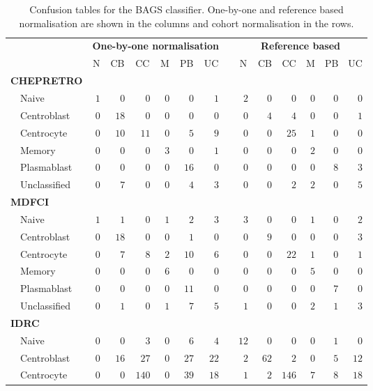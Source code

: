 \begin{table}[!tbp]
{\small
\caption{Confusion tables for the BAGS classifier. One-by-one and reference
based normalisation are shown in the columns and cohort normalisation in the
rows.\label{tab:BAGShemaclass}} 
\begin{center}
\begin{tabular}{lrrrrrrcrrrrrr}
\hline\hline
\multicolumn{1}{l}{\bfseries }&\multicolumn{6}{c}{\bfseries One-by-one normalisation}&\multicolumn{1}{c}{\bfseries }&\multicolumn{6}{c}{\bfseries Reference based}\tabularnewline
\cline{2-7} \cline{9-14}
\multicolumn{1}{l}{}&\multicolumn{1}{c}{N}&\multicolumn{1}{c}{CB}&\multicolumn{1}{c}{CC}&\multicolumn{1}{c}{M}&\multicolumn{1}{c}{PB}&\multicolumn{1}{c}{UC}&\multicolumn{1}{c}{}&\multicolumn{1}{c}{N}&\multicolumn{1}{c}{CB}&\multicolumn{1}{c}{CC}&\multicolumn{1}{c}{M}&\multicolumn{1}{c}{PB}&\multicolumn{1}{c}{UC}\tabularnewline
\hline
{\bfseries CHEPRETRO}&&&&&&&&&&&&&\tabularnewline
~~Naive&$1$&$ 0$&$  0$&$0$&$ 0$&$ 1$&&$ 2$&$ 0$&$  0$&$ 0$&$ 0$&$ 0$\tabularnewline
~~Centroblast&$0$&$18$&$  0$&$0$&$ 0$&$ 0$&&$ 0$&$ 4$&$  4$&$ 0$&$ 0$&$ 1$\tabularnewline
~~Centrocyte&$0$&$10$&$ 11$&$0$&$ 5$&$ 9$&&$ 0$&$ 0$&$ 25$&$ 1$&$ 0$&$ 0$\tabularnewline
~~Memory&$0$&$ 0$&$  0$&$3$&$ 0$&$ 1$&&$ 0$&$ 0$&$  0$&$ 2$&$ 0$&$ 0$\tabularnewline
~~Plasmablast&$0$&$ 0$&$  0$&$0$&$16$&$ 0$&&$ 0$&$ 0$&$  0$&$ 0$&$ 8$&$ 3$\tabularnewline
~~Unclassified&$0$&$ 7$&$  0$&$0$&$ 4$&$ 3$&&$ 0$&$ 0$&$  2$&$ 2$&$ 0$&$ 5$\tabularnewline
\hline
{\bfseries MDFCI}&&&&&&&&&&&&&\tabularnewline
~~Naive&$1$&$ 1$&$  0$&$1$&$ 2$&$ 3$&&$ 3$&$ 0$&$  0$&$ 1$&$ 0$&$ 2$\tabularnewline
~~Centroblast&$0$&$18$&$  0$&$0$&$ 1$&$ 0$&&$ 0$&$ 9$&$  0$&$ 0$&$ 0$&$ 3$\tabularnewline
~~Centrocyte&$0$&$ 7$&$  8$&$2$&$10$&$ 6$&&$ 0$&$ 0$&$ 22$&$ 1$&$ 0$&$ 1$\tabularnewline
~~Memory&$0$&$ 0$&$  0$&$6$&$ 0$&$ 0$&&$ 0$&$ 0$&$  0$&$ 5$&$ 0$&$ 0$\tabularnewline
~~Plasmablast&$0$&$ 0$&$  0$&$0$&$11$&$ 0$&&$ 0$&$ 0$&$  0$&$ 0$&$ 7$&$ 0$\tabularnewline
~~Unclassified&$0$&$ 1$&$  0$&$1$&$ 7$&$ 5$&&$ 1$&$ 0$&$  0$&$ 2$&$ 1$&$ 3$\tabularnewline
\hline
{\bfseries IDRC}&&&&&&&&&&&&&\tabularnewline
~~Naive&$0$&$ 0$&$  3$&$0$&$ 6$&$ 4$&&$12$&$ 0$&$  0$&$ 0$&$ 1$&$ 0$\tabularnewline
~~Centroblast&$0$&$16$&$ 27$&$0$&$27$&$22$&&$ 2$&$62$&$  2$&$ 0$&$ 5$&$12$\tabularnewline
~~Centrocyte&$0$&$ 0$&$140$&$0$&$39$&$18$&&$ 1$&$ 2$&$146$&$ 7$&$ 8$&$18$\tabularnewline

\end{tabular}
\end{center}}
\end{table}

